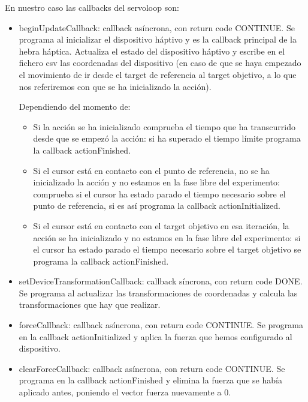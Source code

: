 \documentclass[a4paper,11pt, oneside]{book}
\begin{document}
En nuestro caso las callbacks del servoloop son:
\begin{itemize}
	\item beginUpdateCallback: callback asíncrona, con return code CONTINUE. Se programa al inicializar el dispositivo háptivo y es la callback principal de la hebra háptica.  Actualiza el estado del dispositivo háptivo y escribe en el fichero csv las coordenadas del dispositivo (en caso de que se haya empezado el movimiento de ir desde el target de referencia al target objetivo, a lo que nos referiremos con que se ha inicializado la acción). 
	
	Dependiendo del momento de:
	\begin{itemize}
		\item Si la acción se ha inicializado comprueba el tiempo que ha transcurrido desde que se empezó la acción: si ha superado el tiempo límite programa la callback actionFinished.
		\item Si el cursor está en contacto con el punto de referencia, no se ha inicializado la acción y no estamos en la fase libre del experimento: comprueba si el cursor ha estado parado el tiempo necesario sobre el punto de referencia, si es así programa la callback actionInitialized.\\
		\item Si el cursor está en contacto con el target objetivo en esa iteración, la acción se ha inicializado y no estamos en la fase libre del experimento: si el cursor ha estado parado el tiempo necesario sobre el target objetivo se programa la callback actionFinished.
	\end{itemize}
	
	\item setDeviceTransformationCallback: callback síncrona, con return code DONE. Se programa al actualizar las transformaciones de coordenadas y calcula las transformaciones que hay que realizar.
	
	\item forceCallback: callback asíncrona, con return code CONTINUE. Se programa en la callback actionInitialized y aplica la fuerza que hemos configurado al dispositivo. 
	
	\item clearForceCallback: callback asíncrona, con return code CONTINUE. Se programa en la callback actionFinished y elimina la fuerza que se había aplicado antes, poniendo el vector fuerza nuevamente a 0. 
	

\end{itemize}
\end{document}
